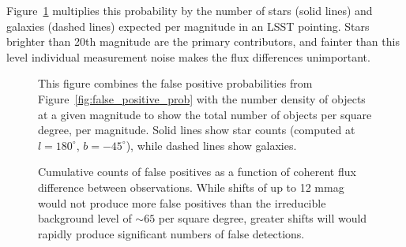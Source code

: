 \documentclass[DM,toc,lsstdraft]{lsstdoc}
\begin{document}
Figure~\ref{fig:false_positive_differential} multiplies this probability by the
number of stars (solid lines) and galaxies (dashed lines) expected per magnitude
in an LSST pointing. Stars brighter than 20th magnitude are the primary
contributors, and fainter than this level individual measurement noise makes the
flux differences unimportant.

\begin{figure}
\caption{This figure combines the false positive probabilities from
Figure~\ref{fig:false_positive_prob} with the number density of objects at a
given magnitude to show the total number of objects per square degree, per magnitude.
Solid lines show star counts (computed at $l=180^\circ$, $b=-45^\circ$), while
dashed lines show galaxies.
\label{fig:false_positive_differential}}
\end{figure}

\begin{figure}
\caption{Cumulative counts of false positives as a function of coherent flux
difference between observations. While shifts of up to 12 mmag would not produce
more false positives than the irreducible background level of $\sim 65$ per
square degree, greater shifts will would rapidly produce significant numbers of
false detections.
\label{fig:fp_vs_flux_shift}}
\end{figure}
\end{document}
